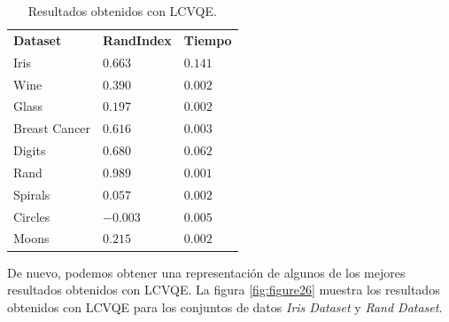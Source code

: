 \begin{table}[!h]
	\centering
	\setlength{\arrayrulewidth}{1mm}
	\setlength{\tabcolsep}{10pt}
	\renewcommand{\arraystretch}{0.9}
	
	\begin{tabular}{ >{\centering\arraybackslash}m{2.5cm}  >{\centering\arraybackslash}m{1.8cm}>{\centering\arraybackslash}m{1.5cm}}
		\hline
		\rowcolor{black}
		\multicolumn{3}{c}{\bf \color{white}{Resultados obtenidos con LCVQE}}\\
		\hline
		\rowcolor{gray!50}
		\textbf{Dataset} & \textbf{RandIndex} & \textbf{Tiempo}  \\
		Iris & $0.663$ & $0.141$  \\
		Wine & $0.390$ & $0.002$  \\
		Glass & $0.197$ & $0.002$  \\
		Breast Cancer & $0.616$ & $0.003$  \\
		Digits & $0.680$ & $0.062$  \\
		Rand & $0.989$ & $0.001$  \\
		Spirals & $0.057$ & $0.002$  \\
		Circles & $-0.003$ & $0.005$  \\
		Moons & $0.215$ & $0.002$  \\
		\hline
		
	\end{tabular}
	\caption{Resultados obtenidos con \acs{LCVQE}.}
	\label{tab:tabla9}
\end{table}

De nuevo, podemos obtener una representación de algunos de los mejores resultados obtenidos con \acs{LCVQE}. La figura \ref{fig:figure26} muestra los resultados obtenidos con \acs{LCVQE} para los conjuntos de datos \textit{Iris Dataset} y \textit{Rand Dataset}. 



